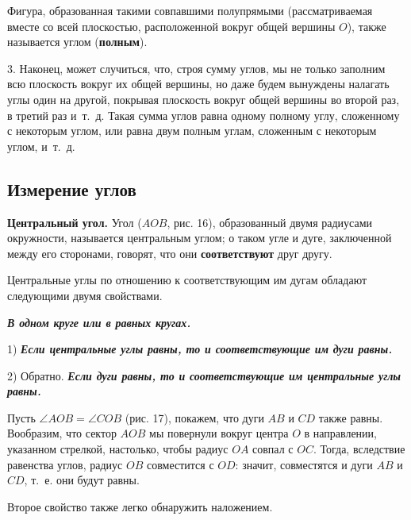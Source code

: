 \documentclass[oneside]{book}
\begin{document}
Фигура, образованная такими совпавшими полупрямыми (рассматриваемая вместе со всей плоскостью, расположенной вокруг общей вершины $O$), также называется углом (\textbf{полным}).


3.
Наконец, может случиться, что, строя сумму углов, мы не только заполним всю плоскость вокруг их общей вершины, но даже будем вынуждены налагать углы один на другой, покрывая плоскость вокруг общей вершины во второй раз, в третий раз и~т.~д.
Такая сумма углов равна одному полному углу, сложенному с некоторым углом, или равна двум полным углам, сложенным с некоторым углом, и~т.~д.

\subsection*{Измерение углов}

\textbf{Центральный угол.}
Угол ($AOB$, рис. 16), образованный двумя радиусами окружности, называется центральным углом;
о таком угле и дуге, заключенной между его сторонами, говорят, что они \textbf{соответствуют} друг другу.

Центральные углы по отношению к соответствующим им дугам обладают следующими двумя свойствами.

\textbf{\emph{В одном круге или в равных кругах.}}

1) \textbf{\emph{Если центральные углы равны, то и соответствующие им дуги равны.}}

2) Обратно.
\textbf{\emph{Если дуги равны, то и соответствующие им центральные углы равны.}}

Пусть $\angle AOB=\angle COB$ (рис. 17), покажем, что дуги $AB$ и $CD$ также равны.
Вообразим, что сектор $AOB$ мы повернули вокруг центра $O$ в направлении, указанном стрелкой, настолько, чтобы радиус $OA$ совпал с $OC$.
Тогда, вследствие равенства углов, радиус $OB$ совместится с $OD$:
значит, совместятся и дуги $AB$ и $CD$, т.~е.
они будут равны.

Второе свойство также легко обнаружить наложением.
\end{document}
